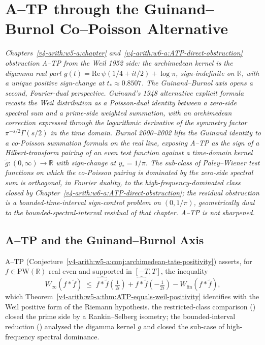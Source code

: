\chapter{A--TP through the Guinand--Burnol Co--Poisson Alternative}
\label{v4-arith:w7-i:chapter}

\emph{Chapters~\ref{v4-arith:w5-a:chapter} and~\ref{v4-arith:w6-a:ATP-direct-obstruction}
obstruction A--TP from the Weil 1952 side: the archimedean kernel is the
digamma real part \(g(t)=\mathrm{Re}\,\psi(1/4+it/2)+\log\pi\),
sign-indefinite on \(\mathbb{R}\), with a unique positive sign-change
at \(t_{\ast}\approx 0.8507\). The Guinand--Burnol axis opens a second,
Fourier-dual perspective. Guinand's 1948 alternative explicit formula
recasts the Weil distribution as a Poisson-dual identity between a
zero-side spectral sum and a prime-side weighted summation, with an
archimedean correction expressed through the logarithmic derivative of
the symmetry factor \(\pi^{-s/2}\Gamma(s/2)\) in the time domain.
Burnol 2000--2002 lifts the Guinand identity to a co-Poisson
summation formula on the real line, exposing A--TP as the sign of a
Hilbert-transform pairing of an even test function against a
time-domain kernel \(\widetilde{g}\colon(0,\infty)\to\mathbb{R}\)
with sign-change at \(y_{\ast}=1/\pi\). The sub-class of
Paley--Wiener test functions on which the co-Poisson pairing is
dominated by the zero-side spectral sum is orthogonal, in Fourier
duality, to the high-frequency-dominated class closed by
Chapter~\ref{v4-arith:w6-a:ATP-direct-obstruction}; the residual
obstruction is a bounded-time-interval sign-control problem on
\((0,1/\pi)\), geometrically dual to the bounded-spectral-interval
residual of that chapter. A--TP is not sharpened.}

\section{A--TP and the Guinand--Burnol Axis}
\label{v4-arith:w7-i:orientation}

A--TP (Conjecture~\ref{v4-arith:w5-a:conj:archimedean-tate-positivity})
asserts, for \(f\in\mathrm{PW}(\mathbb{R})\) real even and supported in
\([-T,T]\), the inequality
\begin{equation}
\label{v4-arith:w7-i:eq:ATP-recall}
W_{\infty}(f\ast\widetilde f)\;\leq\;
\widehat{f\ast\widetilde f}(\tfrac{1}{2i})+\widehat{f\ast\widetilde f}(-\tfrac{1}{2i})
-W_{\mathrm{fin}}(f\ast\widetilde f),
\end{equation}
which Theorem~\ref{v4-arith:w5-a:thm:ATP-equals-weil-positivity}
identifies with the Weil positive form of the Riemann hypothesis.
the restricted-class comparison () closed the prime side by a
Rankin--Selberg isometry; the bounded-interval reduction ()
analysed the digamma kernel \(g\) and closed the sub-case of
high-frequency spectral dominance.

